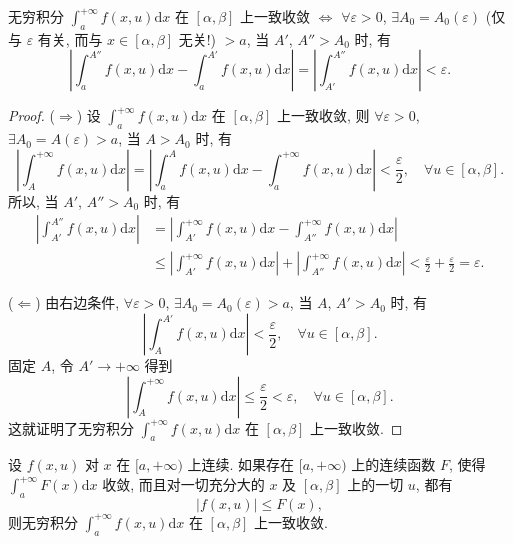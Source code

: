 \begin{theorem}\label{thm:15.2.2}
无穷积分 $\displaystyle\int_{a}^{+\infty}f(x,u)\mathrm{d}x$ 在 $[\alpha,\beta]$ 上一致收敛 $\Leftrightarrow$ $\forall\varepsilon>0$, $\exists A_{0}=A_{0}(\varepsilon)$ (仅与 $\varepsilon$ 有关, 而与 $x\in[\alpha,\beta]$ 无关!) $>a$, 当 $A'$, $A''>A_{0}$ 时, 有
\[
  \left|\int_{a}^{A''}f(x,u)\mathrm{d}x-\int_{a}^{A'}f(x,u)\mathrm{d}x\right|=\left|\int_{A'}^{A''}f(x,u)\mathrm{d}x\right|<\varepsilon.
\]
\end{theorem}

\begin{proof}
($\Rightarrow$) 设 $\displaystyle\int_{a}^{+\infty}f(x,u)\mathrm{d}x$ 在 $[\alpha,\beta]$ 上一致收敛, 则 $\forall\varepsilon>0$, $\exists A_{0}=A(\varepsilon)>a$, 当 $A>A_{0}$ 时, 有
\[
  \left|\int_{A}^{+\infty}f(x,u)\mathrm{d}x\right|=\left|\int_{a}^{A}f(x,u)\mathrm{d}x-\int_{a}^{+\infty}f(x,u)\mathrm{d}x\right|<\frac{\varepsilon}{2},\quad\forall u\in[\alpha,\beta].
\]
所以, 当 $A'$, $A''>A_{0}$ 时, 有
\[
  \begin{aligned}
    \left|\int_{A'}^{A''}f(x,u)\mathrm{d}x\right|&=\left|\int_{A'}^{+\infty}f(x,u)\mathrm{d}x-\int_{A''}^{+\infty}f(x,u)\mathrm{d}x\right|\\
    &\leqslant\left|\int_{A'}^{+\infty}f(x,u)\mathrm{d}x\right|+\left|\int_{A''}^{+\infty}f(x,u)\mathrm{d}x\right|<\frac{\varepsilon}{2}+\frac{\varepsilon}{2}=\varepsilon.
  \end{aligned}
\]

($\Leftarrow$) 由右边条件, $\forall\varepsilon>0$, $\exists A_{0}=A_{0}(\varepsilon)>a$, 当 $A$, $A'>A_{0}$ 时, 有
\[
  \left|\int_{A}^{A'}f(x,u)\mathrm{d}x\right|<\frac{\varepsilon}{2},\quad\forall u\in[\alpha,\beta].
\]
固定 $A$, 令 $A'\to+\infty$ 得到
\[
  \left|\int_{A}^{+\infty}f(x,u)\mathrm{d}x\right|\leqslant\frac{\varepsilon}{2}<\varepsilon,\quad\forall u\in[\alpha,\beta].
\]
这就证明了无穷积分 $\displaystyle\int_{a}^{+\infty}f(x,u)\mathrm{d}x$ 在 $[\alpha,\beta]$ 上一致收敛.
\end{proof}

\begin{theorem}\label{thm:15.2.3}
设 $f(x,u)$ 对 $x$ 在 $[a,+\infty)$ 上连续. 如果存在 $[a,+\infty)$ 上的连续函数 $F$, 使得 $\displaystyle\int_{a}^{+\infty}F(x)\mathrm{d}x$ 收敛, 而且对一切充分大的 $x$ 及 $[\alpha,\beta]$ 上的一切 $u$, 都有
\[
  |f(x,u)|\leqslant F(x),
\]
则无穷积分 $\displaystyle\int_{a}^{+\infty}f(x,u)\mathrm{d}x$ 在 $[\alpha,\beta]$ 上一致收敛.
\end{theorem}

